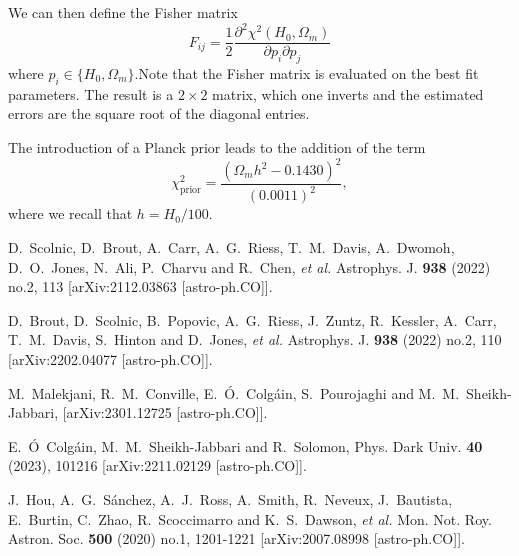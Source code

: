 \documentclass[aps,prl,10pt,twocolumn,superscriptaddress, nofootinbib]{revtex4}
\def\be{\begin{equation}}
\def\ee{\end{equation}}
\begin{document}
We can then define the Fisher matrix 
\be
F_{ij} = \frac{1}{2} \frac{\partial^2 \chi^2(H_0, \Omega_m)}{\partial p_i \partial p_j}
\ee
where $p_i \in \{ H_0, \Omega_m \}$.Note that the Fisher matrix is evaluated on the best fit parameters. The result is a $2 \times 2$ matrix, which one inverts and the estimated errors are the square root of the diagonal entries. 

The introduction of a Planck prior leads to the addition of the term 
\be
\chi_{\textrm{prior}}^2 = \frac{(\Omega_m h^2 - 0.1430)^2}{(0.0011)^2}, 
\ee
where we recall that $h = H_0/100$. 


\begin{thebibliography}{99}

D.~Scolnic, D.~Brout, A.~Carr, A.~G.~Riess, T.~M.~Davis, A.~Dwomoh, D.~O.~Jones, N.~Ali, P.~Charvu and R.~Chen, \textit{et al.}
Astrophys. J. \textbf{938} (2022) no.2, 113
[arXiv:2112.03863 [astro-ph.CO]].


D.~Brout, D.~Scolnic, B.~Popovic, A.~G.~Riess, J.~Zuntz, R.~Kessler, A.~Carr, T.~M.~Davis, S.~Hinton and D.~Jones, \textit{et al.}
Astrophys. J. \textbf{938} (2022) no.2, 110
[arXiv:2202.04077 [astro-ph.CO]].


M.~Malekjani, R.~M.~Conville, E.~\'O.~Colg\'ain, S.~Pourojaghi and M.~M.~Sheikh-Jabbari,
[arXiv:2301.12725 [astro-ph.CO]].


E.~\'O~Colg\'ain, M.~M.~Sheikh-Jabbari and R.~Solomon,
Phys. Dark Univ. \textbf{40} (2023), 101216
[arXiv:2211.02129 [astro-ph.CO]].

J.~Hou, A.~G.~S\'anchez, A.~J.~Ross, A.~Smith, R.~Neveux, J.~Bautista, E.~Burtin, C.~Zhao, R.~Scoccimarro and K.~S.~Dawson, \textit{et al.}
Mon. Not. Roy. Astron. Soc. \textbf{500} (2020) no.1, 1201-1221
[arXiv:2007.08998 [astro-ph.CO]].


\end{thebibliography}
\end{document}
